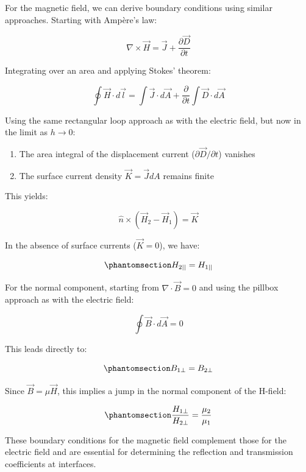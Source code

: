 \documentclass[
  a4paper,
]{book}
\providecommand{\tightlist}{%
  \setlength{\itemsep}{0pt}\setlength{\parskip}{0pt}}
\begin{document}
\begin{tcolorbox}[enhanced jigsaw, coltitle=black, title=\textcolor{quarto-callout-note-color}{\faInfo}\hspace{0.5em}{Boundary Conditions for the Magnetic Field}, colframe=quarto-callout-note-color-frame, toprule=.15mm, opacitybacktitle=0.6, left=2mm, opacityback=0, breakable, toptitle=1mm, bottomtitle=1mm, leftrule=.75mm, arc=.35mm, titlerule=0mm, colbacktitle=quarto-callout-note-color!10!white, rightrule=.15mm, bottomrule=.15mm, colback=white]

For the magnetic field, we can derive boundary conditions using similar
approaches. Starting with Ampère's law:

\[
\nabla \times \vec{H}=\vec{J}+\frac{\partial \vec{D}}{\partial t}
\]

Integrating over an area and applying Stokes' theorem:

\[
\oint \vec{H} \cdot d\vec{l}=\int \vec{J} \cdot d\vec{A}+\frac{\partial}{\partial t}\int \vec{D} \cdot d\vec{A}
\]

Using the same rectangular loop approach as with the electric field, but
now in the limit as \(h \to 0\):

\begin{enumerate}
\def\labelenumi{\arabic{enumi}.}
\tightlist
\item
  The area integral of the displacement current
  (\(\partial \vec{D}/\partial t\)) vanishes
\item
  The surface current density \(\vec{K}=\vec{J}dA\) remains finite
\end{enumerate}

This yields:

\[
\hat{n} \times (\vec{H}_2-\vec{H}_1)=\vec{K}
\]

In the absence of surface currents (\(\vec{K}=0\)), we have:

\begin{equation}\phantomsection\label{eq-h-parallel}{
H_{2||}=H_{1||}
}\end{equation}

For the normal component, starting from \(\nabla \cdot \vec{B}=0\) and
using the pillbox approach as with the electric field:

\[
\oint \vec{B} \cdot d\vec{A}=0
\]

This leads directly to:

\begin{equation}\phantomsection\label{eq-b-perpendicular}{
B_{1\perp}=B_{2\perp}
}\end{equation}

Since \(\vec{B}=\mu\vec{H}\), this implies a jump in the normal
component of the H-field:

\begin{equation}\phantomsection\label{eq-h-perpendicular}{
\frac{H_{1\perp}}{H_{2\perp}}=\frac{\mu_2}{\mu_1}
}\end{equation}

These boundary conditions for the magnetic field complement those for
the electric field and are essential for determining the reflection and
transmission coefficients at interfaces.

\end{tcolorbox}
\end{document}
